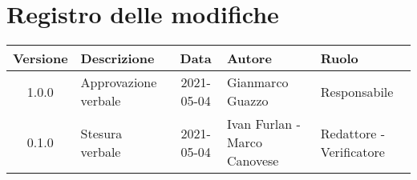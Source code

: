 \section*{Registro delle modifiche}

\begin{center}
	\begin{longtable}{|c|p{4cm}|c|p{3cm}|p{3cm}|}
		\hline
		\rowcolor{lighter-grayer}
		\textbf{Versione} & \textbf{Descrizione} & \textbf{Data} & \textbf{Autore} & \textbf{Ruolo} \\
		\hline
		\endfirsthead

		\hline
		1.0.0 & Approvazione verbale & 2021-05-04 & Gianmarco Guazzo & Responsabile \\
		0.1.0 & Stesura verbale & 2021-05-04 & Ivan Furlan - Marco Canovese & Redattore - Verificatore \\
		\hline
	\end{longtable}
\end{center}